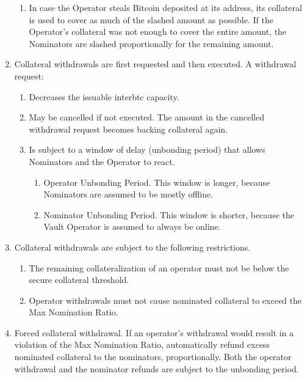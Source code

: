 \documentclass[a4paper,10pt,english]{sphinxmanual}
\begin{document}
\begin{enumerate}
\begin{enumerate}
\item {} 
In case the Operator steals Bitcoin deposited at its address, its collateral is used to cover as much of the slashed amount as possible. If the Operator’s collateral was not enough to cover the entire amount, the Nominators are slashed proportionally for the remaining amount.

\end{enumerate}

\item {} 
Collateral withdrawals are first requested and then executed. A withdrawal request:
\begin{enumerate}
%
\item {} 
Decreases the issuable interbtc capacity.

\item {} 
May be cancelled if not executed. The amount in the cancelled withdrawal request becomes backing collateral again.

\item {} 
Is subject to a window of delay (unbonding period) that allows Nominators and the Operator to react.
\begin{enumerate}
%
\item {} 
Operator Unbonding Period. This window is longer, because Nominators are assumed to be mostly offline.

\item {} 
Nominator Unbonding Period. This window is shorter, because the Vault Operator is assumed to always be online.

\end{enumerate}

\end{enumerate}

\item {} 
Collateral withdrawals are subject to the following restrictions.
\begin{enumerate}
%
\item {} 
The remaining collateralization of an operator must not be below the secure collateral threshold.

\item {} 
Operator withdrawals must not cause nominated collateral to exceed the Max Nomination Ratio.

\end{enumerate}

\item {} 
Forced collateral withdrawal. If an operator’s withdrawal would result in a violation of the Max Nomination Ratio, automatically refund excess nominated collateral to the nominators, proportionally. Both the operator withdrawal and the nominator refunds are subject to the unbonding period.


\end{enumerate}
\end{document}
